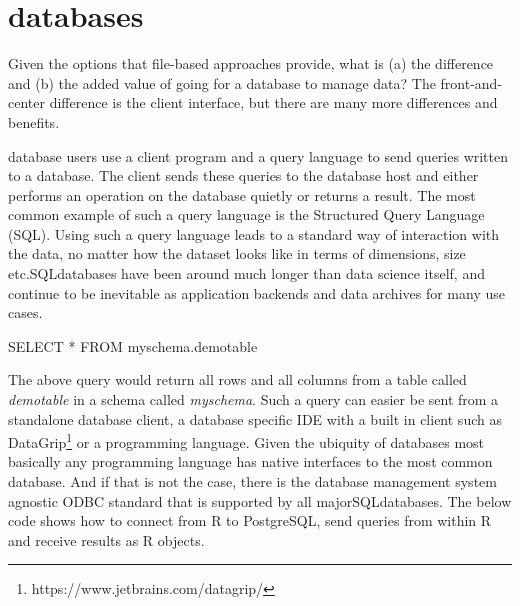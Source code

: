 \documentclass[
  12pt,
  letterpaper,
]{krantz}
\newenvironment{Shaded}{\begin{snugshade}}{\end{snugshade}}
\newcommand{\KeywordTok}[1]{\textcolor[rgb]{0.00,0.23,0.31}{#1}}
\newcommand{\NormalTok}[1]{\textcolor[rgb]{0.00,0.23,0.31}{#1}}
\newcommand{\OperatorTok}[1]{\textcolor[rgb]{0.37,0.37,0.37}{#1}}
\begin{document}
\hypertarget{databases}{%
\section{\texorpdfstring{databases}{databases}}\label{databases}}

Given the options that file-based approaches provide, what is (a) the
difference and (b) the added value of going for a
database to manage data? The front-and-center difference
is the client interface, but there are many more differences and
benefits.

database users use a client program and a query language
to send queries written to a database. The client sends
these queries to the database host and either performs
an operation on the database quietly or returns a
result. The most common example of such a query language is the
Structured Query Language (SQL). Using such a query language
leads to a standard way of interaction with the data, no matter how the
dataset looks like in terms of dimensions, size
etc.SQLdatabases have been around much longer
than data science itself, and continue to be inevitable as application
backends and data archives for many use cases.

\normalsize

\begin{Shaded}
\begin{Highlighting}[]
\KeywordTok{SELECT} \OperatorTok{*} \KeywordTok{FROM}\NormalTok{ myschema.demotable}
\end{Highlighting}
\end{Shaded}

\normalsize

The above query would return all rows and all columns from a table
called \emph{demotable} in a schema called \emph{myschema}. Such a query
can easier be sent from a standalone database client, a
database specific IDE with a built in client such as
DataGrip\footnote{https://www.jetbrains.com/datagrip/} or a programming
language. Given the ubiquity of databases most basically
any programming language has native interfaces to the most common
database. And if that is not the case, there is the
database management system agnostic ODBC standard that
is supported by all majorSQLdatabases. The
below code shows how to connect from R to PostgreSQL,
send queries from within R and receive results as R objects.
\end{document}
